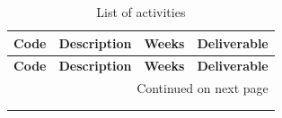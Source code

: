 \begin{center}
\begin{longtable}{cp{}cp{}}
    \label{tab:activities}\\
    \toprule
    \textbf{Code} & \textbf{Description} & \textbf{Weeks} & \textbf{Deliverable} \\
    \midrule
    \endfirsthead

    \toprule
    \textbf{Code} & \textbf{Description} & \textbf{Weeks} & \textbf{Deliverable} \\
    \midrule
    \endhead

    \midrule
    \multicolumn{4}{r}{{Continued on next page}} \\
    \endfoot

    \bottomrule
    \caption{List of activities} \\
    \endlastfoot
    

\end{longtable}
\end{center}
